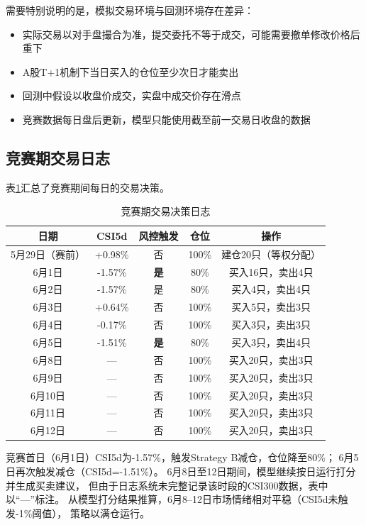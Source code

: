 \documentclass[12pt,a4paper]{ctexart}
\begin{document}
需要特别说明的是，模拟交易环境与回测环境存在差异：
\begin{itemize}[leftmargin=*]
    \item 实际交易以对手盘撮合为准，提交委托不等于成交，可能需要撤单修改价格后重下
    \item A股T+1机制下当日买入的仓位至少次日才能卖出
    \item 回测中假设以收盘价成交，实盘中成交价存在滑点
    \item 竞赛数据每日盘后更新，模型只能使用截至前一交易日收盘的数据
\end{itemize}

\subsection{竞赛期交易日志}

表\ref{tab:competition_log}汇总了竞赛期间每日的交易决策。

\begin{table}[htbp]
\centering
\caption{竞赛期交易决策日志}
\label{tab:competition_log}
\small
\begin{tabular}{ccccc}
\toprule
日期 & CSI5d & 风控触发 & 仓位 & 操作 \\
\midrule
5月29日（赛前） & +0.98\% & 否 & 100\% & 建仓20只（等权分配） \\
6月1日 & -1.57\% & \textbf{是} & 80\% & 买入16只，卖出4只 \\
6月2日 & -1.57\% & 是 & 80\% & 买入4只，卖出4只 \\
6月3日 & +0.64\% & 否 & 100\% & 买入5只，卖出3只 \\
6月4日 & -0.17\% & 否 & 100\% & 买入3只，卖出3只 \\
6月5日 & -1.51\% & \textbf{是} & 80\% & 买入3只，卖出4只 \\
6月8日 & — & 否 & 100\% & 买入20只，卖出3只 \\
6月9日 & — & 否 & 100\% & 买入20只，卖出3只 \\
6月10日 & — & 否 & 100\% & 买入20只，卖出3只 \\
6月11日 & — & 否 & 100\% & 买入20只，卖出3只 \\
6月12日 & — & 否 & 100\% & 买入20只，卖出3只 \\
\bottomrule
\end{tabular}
\end{table}

竞赛首日（6月1日）CSI5d为-1.57\%，触发Strategy B减仓，仓位降至80\%；
6月5日再次触发减仓（CSI5d=-1.51\%）。
6月8日至12日期间，模型继续按日运行打分并生成买卖建议，
但由于日志系统未完整记录该时段的CSI300数据，表中以“—”标注。
从模型打分结果推算，6月8--12日市场情绪相对平稳（CSI5d未触发-1\%阈值），
策略以满仓运行。
\end{document}
